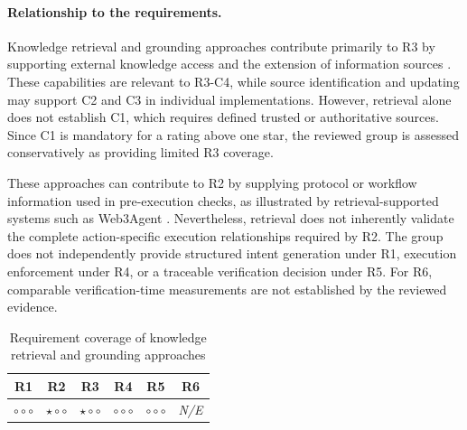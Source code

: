 \paragraph{Relationship to the requirements.}

Knowledge retrieval and grounding approaches contribute
primarily to R3 by supporting external knowledge access
and the extension of information sources
\cite{lewisRetrievalAugmentedGeneration2020,
hanRetrievalAugmentedGenerationGraphs2025}.
These capabilities are relevant to R3-C4, while source
identification and updating may support C2 and C3 in
individual implementations. However, retrieval alone
does not establish C1, which requires defined trusted
or authoritative sources. Since C1 is mandatory for a
rating above one star, the reviewed group is assessed
conservatively as providing limited R3 coverage.

These approaches can contribute to R2 by supplying
protocol or workflow information used in pre-execution
checks, as illustrated by retrieval-supported systems
such as Web3Agent \cite{TODO_Web3Agent}. Nevertheless,
retrieval does not inherently validate the complete
action-specific execution relationships required by R2.
The group does not independently provide structured
intent generation under R1, execution enforcement under
R4, or a traceable verification decision under R5.
For R6, comparable verification-time measurements are
not established by the reviewed evidence.

\begin{table}[H]
\centering
\renewcommand{\arraystretch}{1.3}
\begin{tabular}{cccccc}
\hline
\textbf{R1} & \textbf{R2} & \textbf{R3} &
\textbf{R4} & \textbf{R5} & \textbf{R6} \\
\hline

$\circ\circ\circ$ &
$\star\circ\circ$ &
$\star\circ\circ$ &
$\circ\circ\circ$ &
$\circ\circ\circ$ &
\textit{N/E} \\

\hline
\end{tabular}
\caption{Requirement coverage of knowledge retrieval
and grounding approaches}
\label{tab:req_knowledge_retrieval}
\end{table}





